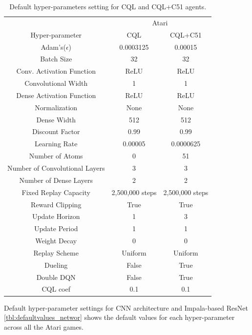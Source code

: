 {\begin{table}[!h]
 \centering
  \caption{Default hyper-parameters setting for CQL and CQL+C51 agents.}
  \label{tbl:defaultvalues_offline}
 \begin{tabular}{@{} ccc @{}}
    \toprule
    & \multicolumn{2}{c}{Atari}\\
    \cmidrule(lr){2-3}
  Hyper-parameter &  CQL & CQL+C51\\
    \midrule
     Adam's($\epsilon$) & 0.0003125 & 0.00015\\
     Batch Size & 32 & 32\\
     Conv. Activation Function & ReLU & ReLU \\
     Convolutional Width & 1& 1\\
     Dense Activation Function & ReLU & ReLU\\
     Normalization & None & None \\
     Dense Width & 512 & 512 \\
     Discount Factor & 0.99 & 0.99 \\
     Learning Rate & 0.00005 & 0.0000625 \\
     Number of Atoms & 0 & 51 \\
     Number of Convolutional Layers & 3 & 3\\
     Number of Dense Layers & 2 & 2\\
     Fixed Replay Capacity & 2,500,000 steps & 2,500,000 steps \\
     Reward Clipping & True & True \\
     Update Horizon & 1 & 3 \\
     Update Period & 1 & 1\\
     Weight Decay & 0 & 0\\
     Replay Scheme & Uniform & Uniform \\
     Dueling & False & True \\
     Double DQN & False & True \\
     CQL coef & 0.1 & 0.1\\
     \bottomrule
  \end{tabular}
\end{table}



Default hyper-parameter settings for CNN architecture \citep{mnih2015humanlevel} and Impala-based ResNet \citep{espeholt2018impala} \autoref{tbl:defaultvalues_networ} shows the default values for each hyper-parameter across all the Atari games. 


}
